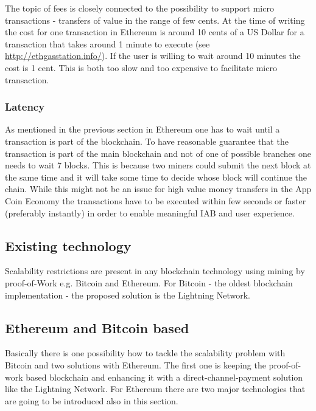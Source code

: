 The topic of fees is closely connected to the possibility to support micro transactions - transfers of value in the range of few cents. At the time of writing the cost for one transaction in Ethereum is around 10 cents of a US Dollar for a transaction that takes around 1 minute to execute (see \url{http://ethgasstation.info/}). If the user is willing to wait around 10 minutes the cost is 1 cent. This is both too slow and too expensive to facilitate micro transaction.

\subsubsection{Latency}
As mentioned in the previous section in Ethereum one has to wait until a transaction is part of the blockchain. To have reasonable guarantee that the transaction is part of the main blockchain and not of one of possible branches one needs to wait 7 blocks. This is because two miners could submit the next block at the same time and it will take some time to decide whose block will continue the chain. While this might not be an issue for high value money transfers in the App Coin Economy the transactions have to be executed within few seconds or faster (preferably instantly) in order to enable meaningful IAB and user experience.

\subsection{Existing technology}
Scalability restrictions are present in any blockchain technology using mining by proof-of-Work e.g. Bitcoin and Ethereum. For Bitcoin - the oldest blockchain implementation - the proposed solution is the Lightning Network.


\subsection{Ethereum and Bitcoin based}

Basically there is one possibility how to tackle the scalability problem with Bitcoin and two solutions with Ethereum. The first one is keeping the proof-of-work based blockchain and enhancing it with a direct-channel-payment solution like the Lightning Network. For Ethereum there are two major technologies that are going to be introduced also in this section.

